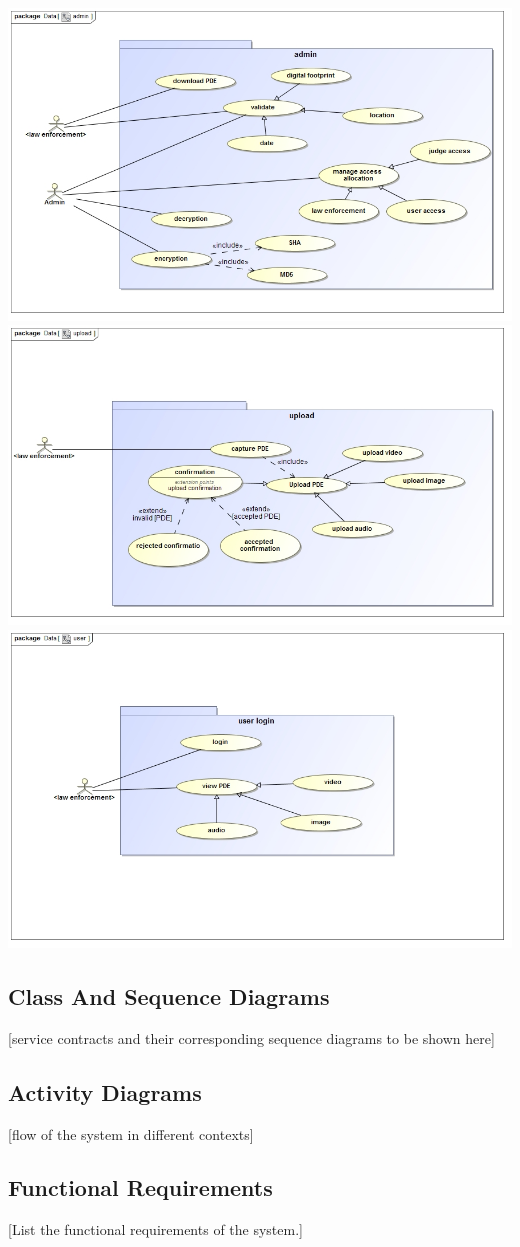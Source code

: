 \documentclass[a4paper,12pt]{article}
\begin{document}
\includegraphics[width=1.0\textwidth]{images/admin.jpg}
\includegraphics[width=1.0\textwidth]{images/upload.jpg}
\includegraphics[width=1.0\textwidth]{images/user.jpg}

\subsection{Class And Sequence Diagrams}
[service contracts and their corresponding sequence diagrams to be shown here]

\subsection{Activity Diagrams}
[flow of the system in different contexts]

\subsection{Functional Requirements}
[List the functional requirements of the system.]
\end{document}
